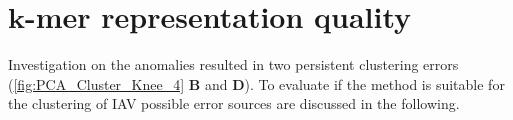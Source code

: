 \section{\texorpdfstring{$\bm{k}$}{k}-mer representation quality} \label{sec:K_mer_Representation}

Investigation on the anomalies resulted in two persistent clustering errors (\autoref{fig:PCA_Cluster_Knee_4} \textbf{\textsf{B}} and \textbf{\textsf{D}}). To evaluate if the method is suitable for the clustering of \gls{IAV} possible error sources are discussed in the following.




